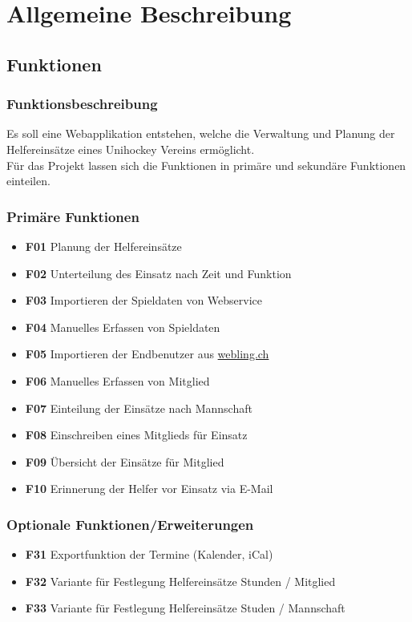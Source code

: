 \chapter{Allgemeine Beschreibung}
    
    \section{Funktionen}
    \subsection{Funktionsbeschreibung}
    Es soll eine Webapplikation entstehen, welche die Verwaltung und Planung der Helfereinsätze eines Unihockey Vereins ermöglicht.
    \\Für das Projekt lassen sich die Funktionen in primäre und sekundäre Funktionen einteilen.    
    
    \subsection{Primäre Funktionen}
    \begin{itemize}
        \item \textbf{F01} Planung der Helfereinsätze
        \item \textbf{F02} Unterteilung des Einsatz nach Zeit und Funktion
        \item \textbf{F03} Importieren der Spieldaten von Webservice
        \item \textbf{F04} Manuelles Erfassen von Spieldaten
        \item \textbf{F05} Importieren der Endbenutzer aus \href{http://www.webling.ch}{webling.ch}
        \item \textbf{F06} Manuelles Erfassen von Mitglied
        \item \textbf{F07} Einteilung der Einsätze nach Mannschaft
        \item \textbf{F08} Einschreiben eines Mitglieds für Einsatz
        \item \textbf{F09} Übersicht der Einsätze für Mitglied
        \item \textbf{F10} Erinnerung der Helfer vor Einsatz via E-Mail
    \end{itemize}
    
    \subsection{Optionale Funktionen/Erweiterungen}
    \begin{itemize}
        \item \textbf{F31} Exportfunktion der Termine (Kalender, iCal)
        \item \textbf{F32} Variante für Festlegung Helfereinsätze Stunden / Mitglied
        \item \textbf{F33} Variante für Festlegung Helfereinsätze Studen  / Mannschaft
    \end{itemize}
    
